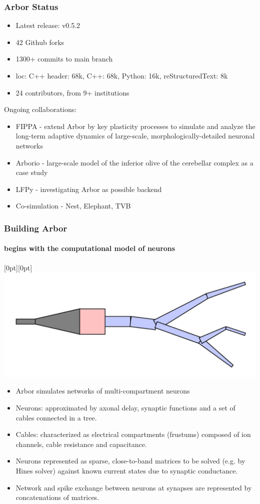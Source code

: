 \documentclass[t]{beamer}
\newcommand{\lenitem}[2][.6\linewidth]{\parbox[t]{#1}{\strut #2\strut}}
\begin{document}
\begin{frame}
    \frametitle{Arbor Status}

    \begin{itemize}
        \item Latest release: v0.5.2
        \item 42 Github forks
        \item 1300+ commits to main branch
        \item loc: C++ header: 68k, C++: 68k, Python: 16k, reStructuredText: 8k
        \item 24 contributors, from 9+ institutions
    \end{itemize}

    Ongoing collaborations:
    \begin{itemize}
    \item FIPPA - extend Arbor by key plasticity processes to simulate and analyze the long-term adaptive dynamics of large-scale, morphologically-detailed neuronal networks
    \item Arborio - large-scale model of the inferior olive of the cerebellar complex as a case study
    \item LFPy - investigating Arbor as possible backend
    \item Co-simulation - Nest, Elephant, TVB
    \end{itemize}

\end{frame}

\begin{frame}
    \frametitle{Building Arbor}
    \framesubtitle{begins with the computational model of neurons}

    \mbox{}\hfill\raisebox{-\height}[0pt][0pt]{\includegraphics[width=.35\linewidth]{cell.pdf}}
    \vspace*{-\baselineskip}

    \begin{itemize}
    \item \lenitem{Arbor simulates networks of multi-compartment neurons}
    \item \lenitem{Neurons: approximated by axonal delay, synaptic functions and a set of cables connected in a tree.}
    \item Cables: characterized as electrical compartments (frustums) composed of ion channels, cable resistance and capacitance.
    \item Neurons represented as sparse, close-to-band matrices to be solved (e.g. by Hines solver) against known current states due to synaptic conductance.
    \item Network and spike exchange between neurons at synapses are represented by concatenations of matrices.
    \end{itemize}

\end{frame}
\end{document}
